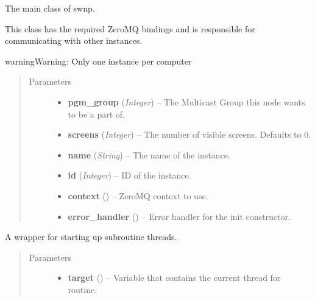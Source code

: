 \documentclass[letterpaper,10pt,english]{sphinxmanual}
\begin{document}
\begin{fulllineitems}
\label{swnp:swnp.SWNP}
The main class of swnp.

This class has the required ZeroMQ bindings and is responsible for
communicating with other instances.

\begin{notice}{warning}{Warning:}
Only one instance per computer
\end{notice}
\begin{quote}\begin{description}
\item[{Parameters}] \leavevmode\begin{itemize}
\item {} 
\textbf{pgm\_group} (\emph{Integer}) -- The Multicast Group this node wants to be a part of.

\item {} 
\textbf{screens} (\emph{Integer}) -- The number of visible screens. Defaults to 0.

\item {} 
\textbf{name} (\emph{String}) -- The name of the instance.

\item {} 
\textbf{id} (\emph{Integer}) -- ID of the instance.

\item {} 
\textbf{context} () -- ZeroMQ context to use.

\item {} 
\textbf{error\_handler} ({\hyperref[wos:wos.CONN_ERR_TH]{}}) -- Error handler for the init constructor.

\end{itemize}

\end{description}\end{quote}

\begin{fulllineitems}
\label{swnp:swnp.SWNP.StartSubRoutine}
A wrapper for starting up subroutine threads.
\begin{quote}\begin{description}
\item[{Parameters}] \leavevmode\begin{itemize}
\item {} 
\textbf{target} () -- Variable that contains the current thread for routine.


\end{itemize}
\end{description}
\end{quote}
\end{fulllineitems}
\end{fulllineitems}
\end{document}
